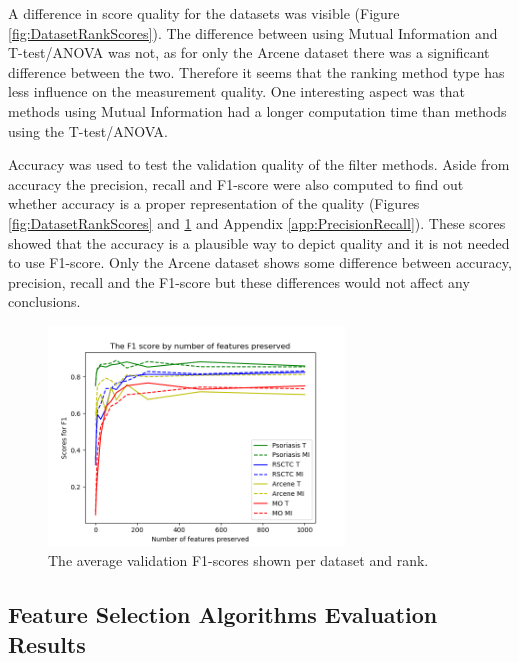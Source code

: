 \documentclass[10pt,a4paper]{report}
\begin{document}
	A difference in score quality for the datasets was visible (Figure \ref{fig:DatasetRankScores}). The difference between using Mutual Information and T-test/ANOVA was not, as for only the Arcene dataset there was a significant difference between the two. Therefore it seems that the ranking method type has less influence on the measurement quality. One interesting aspect was that methods using Mutual Information had a longer computation time than methods using the T-test/ANOVA.
	
	Accuracy was used to test the validation quality of the filter methods. Aside from accuracy the precision, recall and F1-score were also computed to find out whether accuracy is a proper representation of the quality (Figures \ref{fig:DatasetRankScores} and \ref{fig:DatasetRankF1Scores} and Appendix \ref{app:PrecisionRecall}). These scores showed that the accuracy is a plausible way to depict quality and it is not needed to use F1-score. Only the Arcene dataset shows some difference between accuracy, precision, recall and the F1-score but these differences would not affect any conclusions.
	
	\begin{figure}[H]
		\includegraphics[width=0.7\textwidth]{Data_Rank_F1_Scores.png}
		\caption{The average validation F1-scores shown per dataset and rank.}
		\label{fig:DatasetRankF1Scores}
	\end{figure}
	
	\subsection{Feature Selection Algorithms Evaluation Results}
	\label{FSsubsec:FeatureSelectionAlgorithmsEvaluationResults}
	
\end{document}
